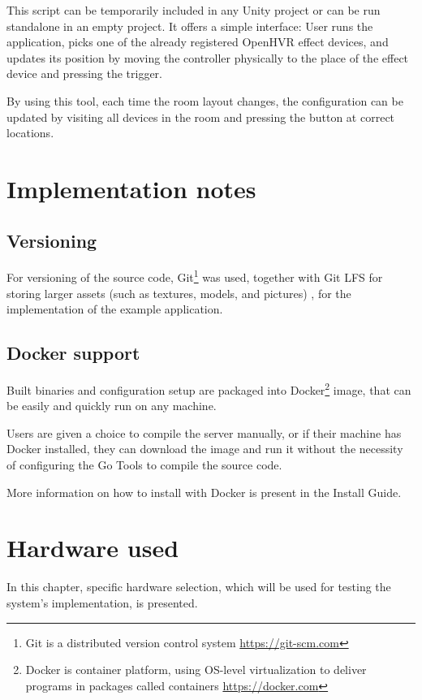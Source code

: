 This script can be temporarily included in any Unity project or can be run
standalone in an empty project. It offers a simple interface:
User runs the application, picks one of the already registered OpenHVR
effect devices, and updates its position by moving the controller physically
to the place of the effect device and pressing the trigger.


By using this tool, each time the room layout changes, the configuration can
be updated by visiting all devices in the room and pressing the button at
correct locations.


\hypertarget{x-implementation-notes}{\section{Implementation notes}}
\hypertarget{x-versioning}{\subsection{Versioning}}
For versioning of the source code, Git\footnote{Git is a distributed version 
control system \href{https://git-scm.com}{https://git-scm.com}}
was used, together with Git LFS for
storing larger assets (such as textures, models, and pictures)
, for the implementation of the example application.


\hypertarget{x-docker-support}{\subsection{Docker support}}
Built binaries and configuration setup are packaged into Docker\footnote{Docker
 is container platform, using OS-level virtualization to deliver programs in 
 packages called containers \href{https://docker.com}{https://docker.com}}
image, that can be easily and quickly run on any machine.


Users are given a choice to compile the server manually, or if their machine has
Docker installed, they can download the image and run it without
the necessity of configuring the Go Tools to compile the source code.

More information on how to install with Docker is present in the Install Guide.

\hypertarget{x-hardware-used}{\section{Hardware used}}
In this chapter, specific hardware selection, which will be used for testing the
system’s implementation, is presented.

